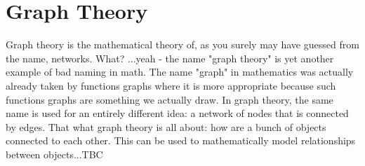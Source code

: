 \chapter{Graph Theory}
Graph theory is the mathematical theory of, as you surely may have guessed from the name, networks. What? ...yeah - the name "graph theory" is yet another example of bad naming in math. The name "graph" in mathematics was actually already taken by functions graphs where it is more appropriate because such functions graphs are something we actually draw. In graph theory, the same name is used for an entirely different idea: a network of nodes that is connected by edges. That what graph theory is all about: how are a bunch of objects connected to each other. This can be used to mathematically model relationships between objects...TBC


\begin{comment}




Chapter 1 | The Beauty of Graph Theory
https://www.youtube.com/watch?v=oXcCAAEDte0&list=PLn9qm_iibFqwjD1TUL8Rvg9rKN7-H8ZNy

Graph Theory Algorithms
https://www.youtube.com/watch?v=DgXR2OWQnLc&list=PLDV1Zeh2NRsDGO4--qE8yH72HFL1Km93P

\end{comment}